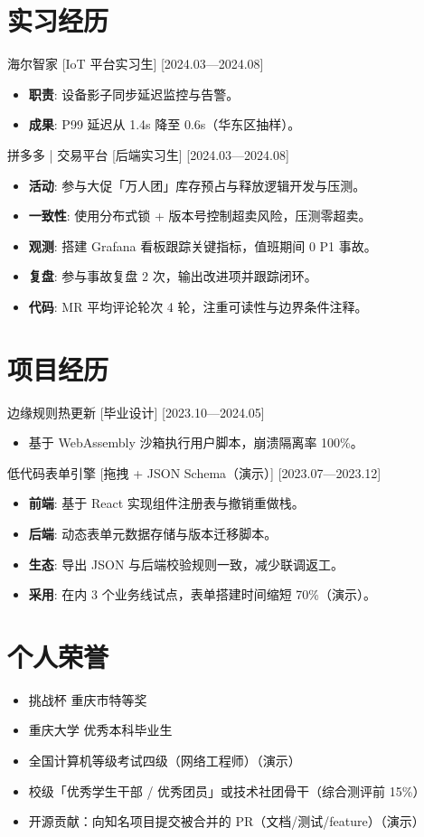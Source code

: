 \documentclass{resume-photo}
\begin{document}
\section{实习经历}
\ResumeItem
{海尔智家}
[\textnormal{IoT 平台实习生}]
[2024.03—2024.08]

\begin{itemize}
  \item \textbf{职责}: 设备影子同步延迟监控与告警。
  \item \textbf{成果}: P99 延迟从 1.4s 降至 0.6s（华东区抽样）。
\end{itemize}


\ResumeItem
{拼多多 | 交易平台}
[\textnormal{后端实习生}]
[2024.03—2024.08]

\begin{itemize}
  \item \textbf{活动}: 参与大促「万人团」库存预占与释放逻辑开发与压测。
  \item \textbf{一致性}: 使用分布式锁 + 版本号控制超卖风险，压测零超卖。
  \item \textbf{观测}: 搭建 Grafana 看板跟踪关键指标，值班期间 0 P1 事故。
  \item \textbf{复盘}: 参与事故复盘 2 次，输出改进项并跟踪闭环。
  \item \textbf{代码}: MR 平均评论轮次 4 轮，注重可读性与边界条件注释。
\end{itemize}



\section{项目经历}
\ResumeItem
{边缘规则热更新}
[\textnormal{毕业设计}]
[2023.10—2024.05]

\begin{itemize}
  \item 基于 WebAssembly 沙箱执行用户脚本，崩溃隔离率 100\%。
\end{itemize}


\ResumeItem
{低代码表单引擎}
[\textnormal{拖拽 + JSON Schema（演示）}]
[2023.07—2023.12]

\begin{itemize}
  \item \textbf{前端}: 基于 React 实现组件注册表与撤销重做栈。
  \item \textbf{后端}: 动态表单元数据存储与版本迁移脚本。
  \item \textbf{生态}: 导出 JSON 与后端校验规则一致，减少联调返工。
  \item \textbf{采用}: 在内 3 个业务线试点，表单搭建时间缩短 70\%（演示）。
\end{itemize}



\section{个人荣誉}
\begin{itemize}
  \item 挑战杯 重庆市特等奖
  \item 重庆大学 优秀本科毕业生
  \item 全国计算机等级考试四级（网络工程师）（演示）
  \item 校级「优秀学生干部 / 优秀团员」或技术社团骨干（综合测评前 15\%）
  \item 开源贡献：向知名项目提交被合并的 PR（文档/测试/feature）（演示）
\end{itemize}
\end{document}
